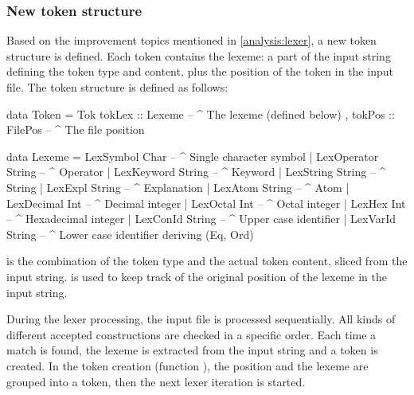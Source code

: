 \subsubsection{New token structure}
Based on the improvement topics mentioned in \autoref{analysis:lexer}, a new token structure is defined.
Each token contains the lexeme: a part of the input string defining the token type and content, plus the position of the token in the input file.
The token structure is defined as follows:

\begin{haskell}
data Token = Tok { tokLex :: Lexeme    -- ^ The lexeme (defined below)
                 , tokPos :: FilePos   -- ^ The file position
                 }

data Lexeme  = LexSymbol      Char     -- ^ Single character symbol
             | LexOperator    String   -- ^ Operator
             | LexKeyword     String   -- ^ Keyword
             | LexString      String   -- ^ String
             | LexExpl        String   -- ^ Explanation
             | LexAtom        String   -- ^ Atom
             | LexDecimal     Int      -- ^ Decimal integer
             | LexOctal       Int      -- ^ Octal integer
             | LexHex         Int      -- ^ Hexadecimal integer
             | LexConId       String   -- ^ Upper case identifier
             | LexVarId       String   -- ^ Lower case identifier
  deriving (Eq, Ord)
\end{haskell}
%
 is the combination of the token type and the actual token content, sliced from the input string.
 is used to keep track of the original position of the lexeme in the input string.

During the lexer processing, the input file is processed sequentially.
All kinds of different accepted constructions are checked in a specific order.
Each time a match is found, the lexeme is extracted from the input string and a token is created.
In the token creation (function ), the position and the lexeme are grouped into a token, then the next lexer iteration is started.
